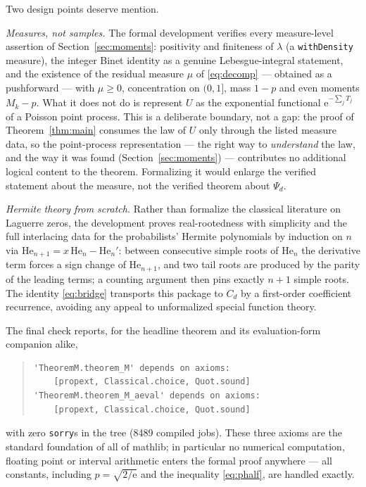 \documentclass[11pt]{amsart}
\theoremstyle{definition}
\theoremstyle{remark}
\newcommand{\e}{\mathrm{e}}
\newcommand{\He}{\mathrm{He}}
\begin{document}
Two design points deserve mention.

\emph{Measures, not samples.} The formal development verifies every
measure-level assertion of Section~\ref{sec:moments}: positivity and
finiteness of $\lambda$ (a \texttt{withDensity} measure), the integer
Binet identity as a genuine Lebesgue-integral statement, and the
existence of the residual measure $\mu$ of \eqref{eq:decomp} ---
obtained as a pushforward --- with $\mu\ge0$, concentration on
$(0,1]$, mass $1-p$ and even moments $M_k-p$. What it does not do is represent $U$ as the
exponential functional $\e^{-\sum_j T_j}$ of a Poisson point process.
This is a deliberate boundary, not a gap: the proof of
Theorem~\ref{thm:main} consumes the law of $U$ only through the
listed measure data, so the point-process representation --- the right
way to \emph{understand} the law, and the way it was found
(Section~\ref{sec:moments}) --- contributes no additional logical
content to the theorem. Formalizing it would enlarge the verified
statement about the measure, not the verified theorem about
$\Psi_d$.

\emph{Hermite theory from scratch.} Rather than formalize the
classical literature on Laguerre zeros, the development proves
real-rootedness with simplicity and the full interlacing data for the
probabilists' Hermite polynomials by induction on $n$ via
$\He_{n+1}=x\,\He_n-\He_n'$: between consecutive simple roots of
$\He_n$ the derivative term forces a sign change of $\He_{n+1}$, and
two tail roots are produced by the parity of the leading terms; a
counting argument then pins exactly $n+1$ simple roots. The identity
\eqref{eq:bridge} transports this package to $C_d$ by a first-order
coefficient recurrence, avoiding any appeal to unformalized special
function theory.

The final check reports, for the headline theorem and its
evaluation-form companion alike,
\begin{quote}
\begin{verbatim}
'TheoremM.theorem_M' depends on axioms:
    [propext, Classical.choice, Quot.sound]
'TheoremM.theorem_M_aeval' depends on axioms:
    [propext, Classical.choice, Quot.sound]
\end{verbatim}
\end{quote}
with zero \texttt{sorry}s in the tree (8489 compiled jobs). These
three axioms are the standard foundation of all of mathlib;
in particular no numerical computation, floating point or interval
arithmetic enters the formal proof anywhere --- all constants,
including $p=\sqrt{2/\e}$ and the inequality \eqref{eq:phalf}, are
handled exactly.
\end{document}

